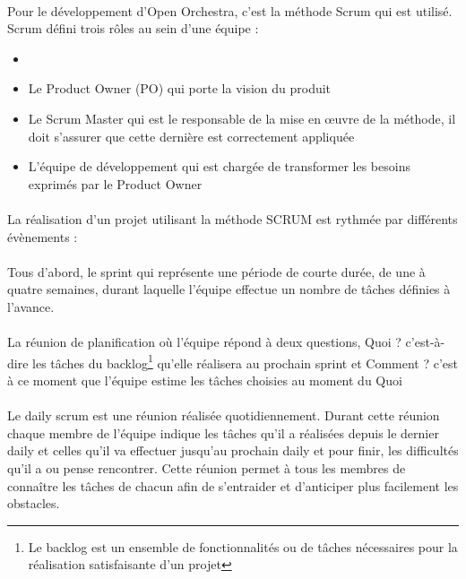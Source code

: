 \paragraph{}
Pour le développement d'Open Orchestra, c'est la méthode Scrum qui est utilisé. Scrum défini trois rôles au sein d'une équipe : 
\begin{itemize}
\item[]
\item  Le \og Product Owner (PO) \fg{} qui porte la vision du produit
\item Le \og Scrum Master \fg{} qui est le responsable de la mise en œuvre de la méthode, il doit s'assurer que cette dernière est correctement appliquée
\item L'équipe de développement qui est chargée de transformer les besoins exprimés par le Product Owner
\end{itemize}
\paragraph{}
La réalisation d'un projet utilisant la méthode SCRUM est rythmée par différents évènements : 
\paragraph{}
Tous d'abord, le sprint qui représente une période de courte durée, de une à quatre semaines, durant laquelle l'équipe effectue un nombre de tâches définies à l'avance.
 \paragraph{}
 La réunion de planification où l'équipe répond à deux questions, \og Quoi ? \fg{} c'est-à-dire les tâches du backlog\footnote{Le backlog est un ensemble de fonctionnalités ou de tâches nécessaires pour la réalisation satisfaisante d'un projet} qu'elle réalisera au prochain sprint et \og Comment ? \fg{} c'est à ce moment que l'équipe estime les tâches choisies au moment du \og Quoi \fg{} 

 \paragraph{}
Le \og daily scrum \fg{} est une réunion réalisée quotidiennement. Durant cette réunion chaque membre de l'équipe indique les tâches qu'il a réalisées depuis le dernier daily et celles qu'il va effectuer jusqu'au prochain daily et pour finir, les difficultés qu'il a ou pense rencontrer.
Cette réunion permet à tous les membres de connaître les tâches de chacun afin de s'entraider et d'anticiper plus facilement les obstacles.
